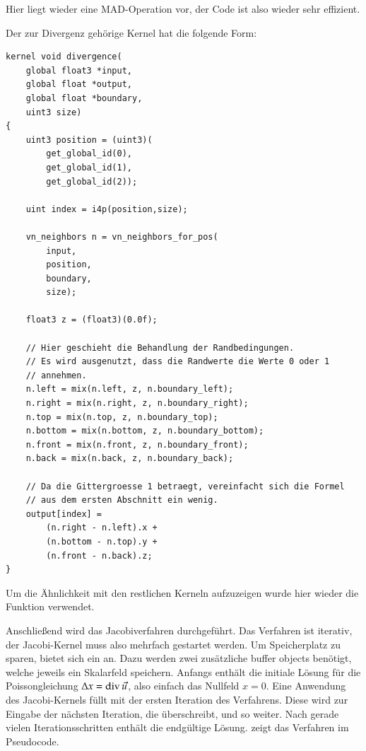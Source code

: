 Hier liegt wieder eine MAD-Operation vor, der Code ist also wieder
sehr effizient.

Der zur Divergenz gehörige Kernel hat die folgende Form:

\begin{verbatim}
kernel void divergence(
    global float3 *input,
    global float *output,
    global float *boundary,
    uint3 size)
{
    uint3 position = (uint3)(
        get_global_id(0),
        get_global_id(1),
        get_global_id(2));

    uint index = i4p(position,size);

    vn_neighbors n = vn_neighbors_for_pos(
        input,
        position,
        boundary,
        size);

    float3 z = (float3)(0.0f);

    // Hier geschieht die Behandlung der Randbedingungen.
    // Es wird ausgenutzt, dass die Randwerte die Werte 0 oder 1
    // annehmen.
    n.left = mix(n.left, z, n.boundary_left);
    n.right = mix(n.right, z, n.boundary_right);
    n.top = mix(n.top, z, n.boundary_top);
    n.bottom = mix(n.bottom, z, n.boundary_bottom);
    n.front = mix(n.front, z, n.boundary_front);
    n.back = mix(n.back, z, n.boundary_back);

    // Da die Gittergroesse 1 betraegt, vereinfacht sich die Formel
    // aus dem ersten Abschnitt ein wenig.
    output[index] =
        (n.right - n.left).x +
        (n.bottom - n.top).y +
        (n.front - n.back).z;
}
\end{verbatim}

Um die Ähnlichkeit mit den restlichen Kerneln aufzuzeigen wurde hier
wieder die Funktion  verwendet.

Anschließend wird das Jacobiverfahren durchgeführt. Das
Verfahren ist iterativ, der Jacobi-Kernel muss also mehrfach gestartet
werden. Um Speicherplatz zu sparen, bietet sich ein
 an. Dazu werden zwei zusätzliche
buffer objects  benötigt, welche jeweils ein
Skalarfeld speichern. Anfangs enthält  die
initiale Lösung für die Poissongleichung $\Delta x =
\operatorname*{div} \vec{u}$, also einfach das Nullfeld $x=0$. Eine Anwendung des
Jacobi-Kernels füllt  mit der ersten Iteration
des Verfahrens. Diese wird zur Eingabe der nächsten Iteration, die
 überschreibt, und so weiter. Nach gerade vielen
Iterationsschritten enthält  die endgültige
Lösung.  zeigt das
Verfahren im Pseudocode.

